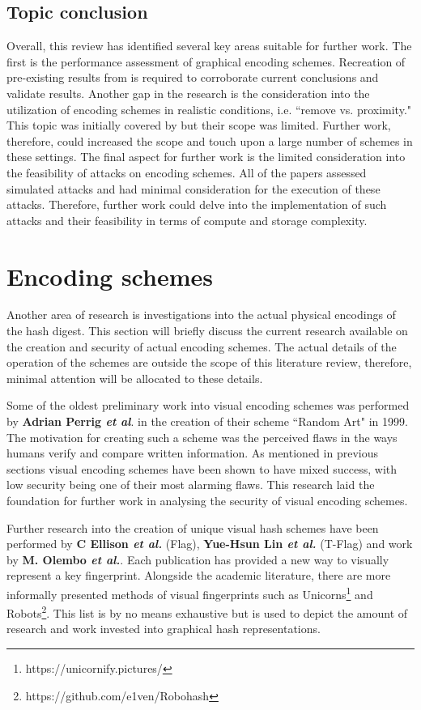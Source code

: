 \subsection{Topic conclusion}
Overall, this review has identified several key areas suitable for further work.
The first is the performance assessment of graphical encoding schemes. Recreation of pre-existing results from \cite{hsiao2009study}\cite{tan2017can} is required to corroborate current conclusions and validate results.
Another gap in the research is the consideration into the utilization of encoding schemes in realistic conditions, i.e. ``remove vs. proximity." This topic was initially covered by \cite{shirvanian2017pitfalls} but their scope was limited. Further work, therefore, could increased the scope and touch upon a large number of schemes in these settings.
The final aspect for further work is the limited consideration into the feasibility of attacks on encoding schemes. All of the papers assessed simulated attacks and had minimal consideration for the execution of these attacks. Therefore, further work could delve into the implementation of such attacks and their feasibility in terms of compute and storage complexity.

\section{Encoding schemes}
Another area of research is investigations into the actual physical encodings of the hash digest. This section will briefly discuss the current research available on the creation and security of actual encoding schemes. The actual details of the operation of the schemes are outside the scope of this literature review, therefore, minimal attention will be allocated to these details.

Some of the oldest preliminary work into visual encoding schemes was performed by \textbf{Adrian Perrig \textit{et al}}\cite{perrig1999hash}. in the creation of their scheme ``Random Art" in 1999. The motivation for creating such a scheme was the perceived flaws in the ways humans verify and compare written information. As mentioned in previous sections visual encoding schemes have been shown to have mixed success, with low security being one of their most alarming flaws. This research laid the foundation for further work in analysing the security of visual encoding schemes.

Further research into the creation of unique visual hash schemes have been performed by \textbf{C Ellison \textit{et al.}} \cite{ellison2003public} (Flag), \textbf{Yue-Hsun Lin \textit{et al.}}\cite{lin2010spate} (T-Flag) and work by \textbf{M.  Olembo \textit{et al.}}\cite{olembo2013developing}. Each publication has provided a new way to visually represent a key fingerprint. Alongside the academic literature, there are more informally presented methods of visual fingerprints such as Unicorns\footnote{https://unicornify.pictures/} and Robots\footnote{https://github.com/e1ven/Robohash}. This list is by no means exhaustive but is used to depict the amount of research and work invested into graphical hash representations.

